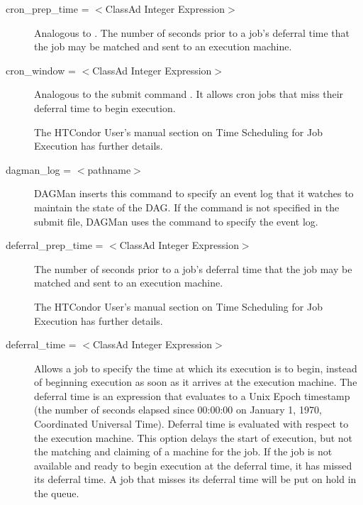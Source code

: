 \begin{description}
\label{condor-submit-cron-prep-time}
\item[cron\_prep\_time = $<$ClassAd Integer Expression$>$]
Analogous to .
The number of seconds prior to a job's deferral time that
the job may be matched and sent to an execution machine.


\label{condor-submit-cron-window}
\item[cron\_window = $<$ClassAd Integer Expression$>$]
Analogous to the submit command .
It allows cron jobs that
miss their deferral time to begin execution.

The HTCondor User's manual section on Time Scheduling for Job Execution
has further details.


\label{condor-submit-dagman-log}
\item[dagman\_log = $<$pathname$>$] 
DAGMan inserts this command to specify an event log that it watches to maintain
the state of the DAG. If the  command is not specified in the
submit file, DAGMan uses the  command to specify the event log.


\label{condor-submit-deferral-prep-time}
\item[deferral\_prep\_time = $<$ClassAd Integer Expression$>$]
The number of seconds prior to a job's deferral time that
the job may be matched and sent to an execution machine.

The HTCondor User's manual section on Time Scheduling for Job Execution
has further details.


\label{condor-submit-deferral-time}
\item[deferral\_time = $<$ClassAd Integer Expression$>$]
Allows a job to specify the time at which its execution
is to begin,
instead of beginning execution as soon as it arrives at the execution
machine. The deferral time is an expression that 
evaluates to a Unix Epoch timestamp (the number of
seconds elapsed since 00:00:00 on January 1, 1970, Coordinated
Universal Time). 
Deferral time is evaluated with respect to the execution machine.
This option delays the start of
execution, but not the matching and claiming of
a machine for the job.
If the job is not available and ready to begin
execution at the deferral time, it has missed its deferral time.
A job that misses its deferral time will be put on hold
in the queue. 


\end{description}
